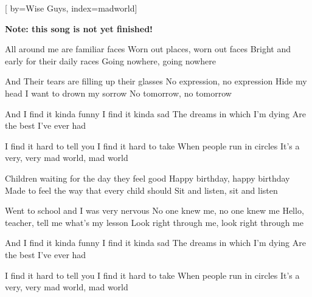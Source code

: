 
[%
    by={Wise Guys},
    index={madworld}]


    \label{madworld}

    \textbf{Note: this song is not yet finished!}

    \beginverse
        All around me are familiar faces
        Worn out places, worn out faces
        Bright and early for their daily races
        Going nowhere, going nowhere

        And Their tears are filling up their glasses
        No expression, no expression
        Hide my head I want to drown my sorrow
        No tomorrow, no tomorrow
    \endverse

    \beginchorus
        And I find it kinda funny
        I find it kinda sad
        The dreams in which I'm dying
        Are the best I've ever had

        I find it hard to tell you
        I find it hard to take
        When people run in circles
        It's a very, very mad world, mad world
    \endchorus

    \beginverse
        Children waiting for the day they feel good
        Happy birthday, happy birthday
        Made to feel the way that every child should
        Sit and listen, sit and listen

        Went to school and I was very nervous
        No one knew me, no one knew me
        Hello, teacher, tell me what's my lesson
        Look right through me, look right through me
    \endverse

    \beginchorus
        And I find it kinda funny
        I find it kinda sad
        The dreams in which I'm dying
        Are the best I've ever had

        I find it hard to tell you
        I find it hard to take
        When people run in circles
        It's a very, very mad world, mad world
    \endchorus
\endsong
